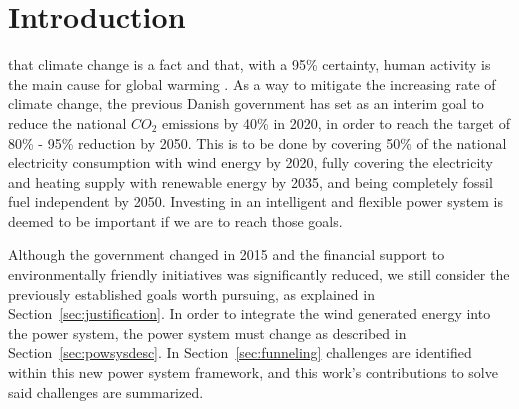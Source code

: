 \chapter{Introduction}
 that climate change is a fact and that, with a 95\% certainty, human activity is the main cause for global warming . As a way to mitigate the increasing rate of climate change, the previous Danish government  has set as an interim goal to reduce the national $CO_2$ emissions by 40\% in 2020, in order to reach the target of 80\% - 95\% reduction by 2050. This is to be done by covering 50\% of the national electricity consumption with wind energy by 2020, fully covering the electricity and heating supply with renewable energy by 2035, and being completely fossil fuel independent by 2050. Investing in an intelligent and flexible power system is deemed to be important if we are to reach those goals.

Although the government  changed in 2015 and the financial support to environmentally friendly initiatives was significantly reduced, we still consider the previously established goals worth pursuing, as explained in Section~\ref{sec:justification}. In order to integrate the wind generated energy into the power system, the power system must change as described in Section~\ref{sec:powsysdesc}. In Section~\ref{sec:funneling} challenges are identified within this new power system framework, and this work's contributions to solve said challenges are summarized.
